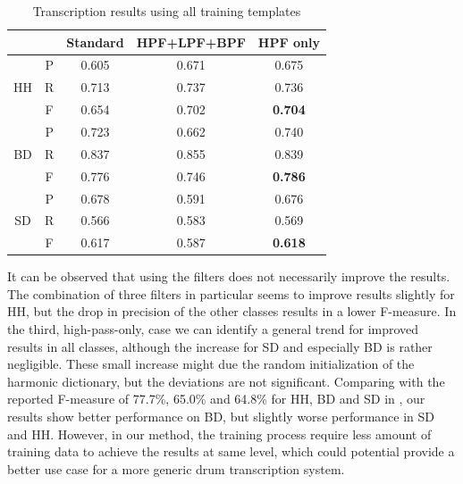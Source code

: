 \documentclass{article}
\begin{document}
\begin{table}[h]
\begin{center}
\begin{tabular}{|c|c|c|c|c|}
\hline
\multicolumn{2}{|c|}{}  & Standard & HPF+LPF+BPF & HPF only \\ \hline
\multirow{3}{*}{HH} & P & 0.605    & 0.671       & 0.675    \\ \cline{2-5} 
                    & R & 0.713    & 0.737       & 0.736    \\ \cline{2-5} 
                    & F & 0.654    & 0.702       & \textbf{0.704}    \\ \hline
\multirow{3}{*}{BD} & P & 0.723    & 0.662       & 0.740    \\ \cline{2-5} 
                    & R & 0.837    & 0.855       & 0.839    \\ \cline{2-5} 
                    & F & 0.776    & 0.746       & \textbf{0.786}    \\ \hline
\multirow{3}{*}{SD} & P & 0.678    & 0.591       & 0.676    \\ \cline{2-5} 
                    & R & 0.566    & 0.583       & 0.569    \\ \cline{2-5} 
                    & F & 0.617    & 0.587       & \textbf{0.618}    \\ \hline
\end{tabular}
\end{center}
 \caption{Transcription results using all training templates} %
 \label{tab:basicResults}
\end{table}

It can be observed that using the filters does not necessarily improve the results. The combination of three filters in particular seems to improve results slightly for HH, but the drop in precision of the other classes results in a lower F-measure. In the third, high-pass-only, case we can identify a general trend for improved results in all classes, although the increase for SD and especially BD is rather negligible. These small increase might due the random initialization of the harmonic dictionary, but the deviations are not significant.   
Comparing with the reported F-measure of 77.7\%, 65.0\% and 64.8\% for HH, BD and SD in \cite{gillet_transcription_2008}, our results show better performance on BD, but slightly worse performance in SD and HH. However, in our method, the training process require less amount of training data to achieve the results at same level, which could potential provide a better use case for a more generic drum transcription system.     
\end{document}
